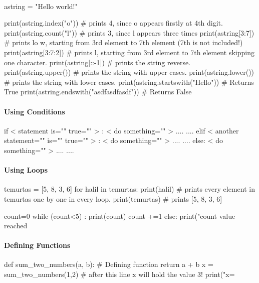 \-
\\
\-
    
\begin{python}
astring = "Hello world!" 

print(astring.index("o"))	# prints 4, since o appears firstly at 4th digit.
print(astring.count("l"))	# prints 3, since l appears three times 
print(astring[3:7])		# prints lo w, starting from 3rd element to 7th element (7th is not included!) 
print(astring[3:7:2])	# prints l, starting from 3rd element to 7th element skipping one character. 
print(astring[::-1])    # prints the string reverse.           
print(astring.upper())  # prints the string with upper cases.  
print(astring.lower())  # prints the string with lower cases.  
print(astring.startswith("Hello"))	# Returns True  
print(astring.endswith("asdfasdfasdf"))	# Returns False     

\end{python}
\paragraph{Using Conditions}


\begin{python}
if  < statement is="" true="" > : 
    < do something="" >
    .... 
    ....
elif < another statement="" is="" true="" > :  
     < do something="" >
    ....
    .... 
else:
     < do something="" >
    ....
    ....
\end{python}
\paragraph{Using Loops} 
\begin{python}
temurtas = [5, 8, 3, 6] 
for halil in temurtas: 
    print(halil)	# prints every element in temurtas one by one in every loop. 
print(temurtas)	# prints [5, 8, 3, 6]
\end{python}
\begin{python}
count=0  
while (count<5) :
    print(count)
    count +=1
else:
    print("count value reached %
\end{python}
\paragraph{Defining Functions}
\begin{python}
def sum_two_numbers(a, b):   # Defining function  
    return a + b 
x = sum_two_numbers(1,2)	# after this line x will hold the value 3! 
print("x=%
\end{python}
